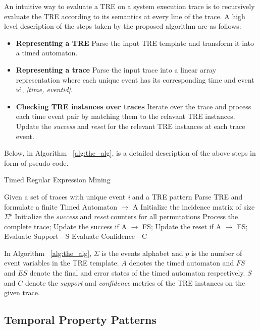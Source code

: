 \documentclass[]{sigplanconf}
\begin{document}
An intuitive way to evaluate a TRE on a system execution trace is to recursively evaluate the TRE according to its semantics at every line of the trace. A high level description of the steps taken by the proposed algorithm are as follows:

\begin{itemize}
\item \textbf{Representing a TRE} Parse the input TRE template and transform it into a timed automaton.
\item \textbf{Representing a trace} Parse the input trace into a linear array representation where each unique event has its corresponding time and event id, \emph{[time, eventid]}.
\item \textbf{Checking TRE instances over traces} Iterate over the trace and process each time event pair by matching them to the relavant TRE instances. Update the \emph{success} and \emph{reset} for the relevant TRE instances at each trace event.
\end{itemize}

Below, in Algorithm ~\ref{alg:the_alg}, is a detailed description of the above steps in form of pseudo code.

\begin{algorithm}[h]
    \caption{Timed Regular Expression Mining}\label{alg:the_alg}
    \begin{algorithmic}[1]
     \Require  Given a set of traces with unique event \emph{i} and a TRE pattern
     \Ensure Parse TRE and formulate a finite Timed Automaton $\rightarrow$ A
     \State Initialize the incidence matrix of size $\Sigma^p$
     \State Initialize the \emph{success} and \emph{reset} counters for all permutations
        \State Process the complete trace;
        \State Update the success if A $\rightarrow$ FS;
        \State Update the reset if A $\rightarrow$ ES;
     \EndFor
     \State Evaluate Support - S
     \State Evaluate Confidence - C
    \end{algorithmic}
\end{algorithm}

In Algorithm ~\ref{alg:the_alg}, $\Sigma$ is the events alphabet and $p$ is the number of event variables in the TRE template. $A$ denotes the timed automaton and $FS$ and $ES$ denote the final and error states of the timed automaton respectively. $S$ and $C$ denote the \emph{support} and \emph{confidence} metrics of the TRE instances on the given trace.

\subsection{Temporal Property Patterns}
\end{document}
